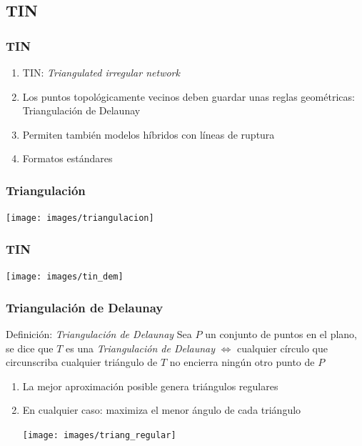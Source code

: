\subsection{TIN}
\begin{frame}
  \frametitle{TIN}
  \begin{enumerate}
    \item \alert{TIN}: \emph{Triangulated irregular network}
    \item Los puntos topológicamente vecinos deben guardar unas reglas
      geométricas: \alert{Triangulación de Delaunay}
    \item Permiten también modelos híbridos con líneas de ruptura
    \item Formatos estándares
  \end{enumerate}
\end{frame}
\begin{frame}
  \frametitle{Triangulación}
  \begin{center}
        \texttt{[image: images/triangulacion]}
  \end{center}
\end{frame}
\begin{frame}
  \frametitle{TIN}
  \begin{center}
        \texttt{[image: images/tin\_dem]}
  \end{center}
\end{frame}
\begin{frame}
  \frametitle{Triangulación de Delaunay}
  \begin{beamerboxesrounded}[shadow=true]{Definición: \emph{Triangulación de
    Delaunay}}
    Sea $P$ un conjunto de puntos en el \alert{plano}, se dice que $T$ es una
    \alert{\emph{Triangulación de Delaunay}} $\Leftrightarrow$ cualquier círculo que
    circunscriba cualquier triángulo de $T$ no encierra ningún otro punto de $P$
    \end{beamerboxesrounded}
  \begin{enumerate}
    \item La mejor aproximación posible genera triángulos regulares
    \item En cualquier caso: maximiza el menor ángulo de cada triángulo
  \begin{center}
        \texttt{[image: images/triang\_regular]}
  \end{center}
  \end{enumerate}
\end{frame}
